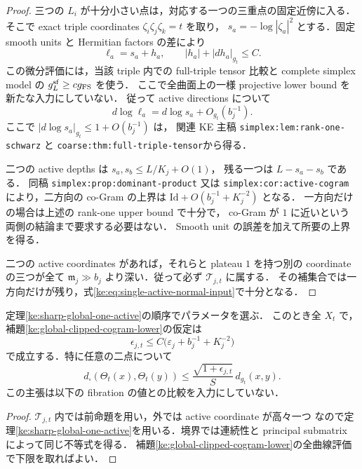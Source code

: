 \begin{proof}
三つの $L_i$ が十分小さい点は，対応する一つの三重点の固定近傍に入る．
そこで exact triple coordinates $\zeta_i\zeta_j\zeta_k=t$ を取り，
$s_a=-\log|\zeta_a|^2$ とする．固定 smooth units と Hermitian factors の差により
\[
 \ell_a=s_a+h_a,
 \qquad |h_a|+|dh_a|_{g_t}\le C.
\]
この微分評価には，当該 triple 内での full-triple tensor 比較と
complete simplex model の $g_L^{\rm sf}\ge c g_{\rm FS}$ を使う．
ここで全曲面上の一様 projective lower bound を新たな入力にしていない．
従って active directions について
\[
 d\log\ell_a=d\log s_a+O_{g_t}(b_j^{-1}).
\]
ここで $|d\log s_a|_{g_t}\le1+O(b_j^{-1})$ は，
関連 KE 主稿 \texttt{simplex:lem:rank-one-schwarz} と
\texttt{coarse:thm:full-triple-tensor}から得る．

二つの active depths は $s_a,s_b\le L/K_j+O(1)$，
残る一つは $L-s_a-s_b$ である．
同稿 \texttt{simplex:prop:dominant-product} 又は
\texttt{simplex:cor:active-cogram} により，二方向の co-Gram の上界は
$\mathrm{Id}+O(b_j^{-1}+K_j^{-2})$ となる．
一方向だけの場合は上述の rank-one upper bound で十分で，
co-Gram が $1$ に近いという両側の結論まで要求する必要はない．
Smooth unit の誤差を加えて所要の上界を得る．

二つの active coordinates があれば，それらと plateau $1$ を持つ別の coordinate
の三つが全て $\mathfrak m_j\gg b_j$ より深い．従って必ず $\mathcal T_{j,t}$ に属する．
その補集合では一方向だけが残り，式\eqref{ke:eq:single-active-normal-input}で十分となる．
\end{proof}

\begin{corollary}
\label{ke:global-depth-lipschitz}
定理\ref{ke:sharp-global-one-active}の順序でパラメータを選ぶ．
このとき全 $X_t$ で，補題\ref{ke:global-clipped-cogram-lower}の仮定は
\[
 \epsilon_{j,t}\le C\bigl(\varepsilon_j+b_j^{-1}+K_j^{-2}\bigr)
\]
で成立する．特に任意の二点について
\begin{equation}\label{ke:eq:global-depth-lipschitz}
 d_\square(\Theta_t(x),\Theta_t(y))
 \le\frac{\sqrt{1+\epsilon_{j,t}}}{S}\,d_{g_t}(x,y).
\end{equation}
この主張は以下の fibration の値との比較を入力にしていない．
\end{corollary}

\begin{proof}
$\mathcal T_{j,t}$ 内では前命題を用い，外では active coordinate が高々一つ
なので定理\ref{ke:sharp-global-one-active}を用いる．境界では連続性と
principal submatrix によって同じ不等式を得る．
補題\ref{ke:global-clipped-cogram-lower}の全曲線評価で下限を取ればよい．
\end{proof}

